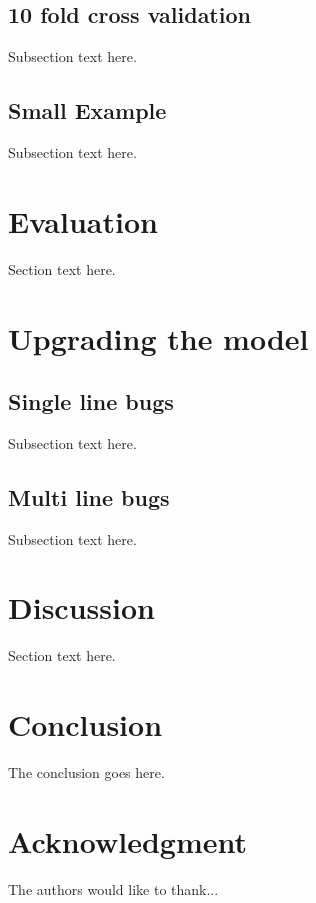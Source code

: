 \documentclass[conference]{IEEEtran}
\begin{document}
{{\subsection{10 fold cross validation}
Subsection text here.

\subsection{Small Example}
Subsection text here.


\section{Evaluation}
Section text here.

\section{Upgrading the model}

\subsection{Single line bugs}
Subsection text here.

\subsection{Multi line bugs}
Subsection text here.

\section{Discussion}
Section text here.



\section{Conclusion}
The conclusion goes here.






\section*{Acknowledgment}


The authors would like to thank...






}}
\end{document}
